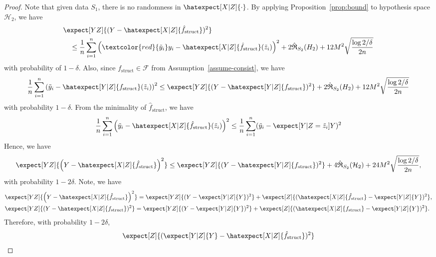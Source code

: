 \begin{proof}
Note that given data $S_1$, there is no randomness in $\hatexpect[X|Z]{\cdot}$. By applying Proposition~\ref{prop:bound} to hypothesis space $\mathcal{H}_2$, we have
\begin{align*}
    &\expect[YZ]{(Y - \hatexpect[X|Z]{\hat{f}_{\mathrm{struct}}})^2} \\
    &\quad \leq  \frac1n \sum_{i=1}^n {\left(\textcolor{red}{\tilde{y}_i}y_i - \hatexpect[X|Z]{\hat{f}_{\mathrm{struct}}}(\tilde z_i)\right)^2} +  2\hat{\mathfrak{R}}_{S_2}(H_2) + 12M^2\sqrt{\frac{\log 2/\delta}{2n}}
\end{align*}
with probability of $1-\delta$. Also, since $f_{\mathrm{struct}} \in \mathcal{F}$ from Assumption~\ref{assume-consist}, we have
\begin{align*}
    \frac1n \sum_{i=1}^n \left(\tilde{y}_i - \hatexpect[Y|Z]{f_{\mathrm{struct}}}(\tilde z_i)\right)^2 \leq  \expect[YZ]{(Y - \hatexpect[Y|Z]{f_{\mathrm{struct}}})^2} +  2\hat{\mathfrak{R}}_{S_2}(H_2) + 12M^2\sqrt{\frac{\log 2/\delta}{2n}}
\end{align*}
with probability $1-\delta$. From the minimality of $\hat{f}_{\mathrm{struct}}$, we have
\begin{align*}
    \frac1n \sum_{i=1}^n {\left(\tilde y_i - \hatexpect[X|Z]{\hat{f}_{\mathrm{struct}}}(\tilde z_i)\right)^2} \leq  \frac1n \sum_{i=1}^n (\tilde{y}_i - \expect[Y|Z=\tilde{z}_i]{Y})^2
\end{align*}
Hence, we have
\begin{align*}
    \expect[YZ]{\left(Y - \hatexpect[X|Z]{\hat{f}_{\mathrm{struct}}}\right)^2} \leq \expect[YZ]{(Y - \hatexpect[Y|Z]{f_{\mathrm{struct}}})^2} +  4\hat{\mathfrak{R}}_{S_2}(\mathcal{H}_2) + 24M^2\sqrt{\frac{\log 2/\delta}{2n}},
\end{align*}
with probability $1-2\delta$.
Note, we have 
\begin{align*}
    &\expect[YZ]{\left(Y - \hatexpect[X|Z]{\hat{f}_{\mathrm{struct}}}\right)^2} = \expect[YZ]{(Y - \expect[Y|Z]{Y})^2} + \expect[Z]{(\hatexpect[X|Z]{\hat{f}_{\mathrm{struct}}} - \expect[Y|Z]{Y})^2},\\
    &\expect[YZ]{(Y - \hatexpect[X|Z]{f_{\mathrm{struct}}})^2} = \expect[YZ]{(Y - \expect[Y|Z]{Y})^2} + \expect[Z]{(\hatexpect[X|Z]{{f}_{\mathrm{struct}}} - \expect[Y|Z]{Y})^2}.
\end{align*}
Therefore, with probability $1-2\delta$,
\begin{align*}
    &\expect[Z]{(\expect[Y|Z]{Y} - \hatexpect[X|Z]{\hat{f}_{\mathrm{struct}}})^2} \\

\end{align*}
\end{proof}
